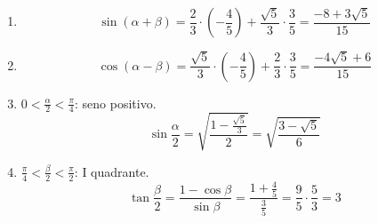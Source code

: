 \begin{question}[ID=1.1, subtitle={Formule di addizione con $\sin\alpha=2/3$ e $\sin\beta=3/5$}, tags={goniometria, formule di addizione}, difficulty=media]
\begin{explanation}
\begin{enumerate}
    \item \[ \sin(\alpha+\beta)=\dfrac23\cdot\left(-\dfrac45\right)+\dfrac{\sqrt5}{3}\cdot\dfrac35=\dfrac{-8+3\sqrt5}{15} \]
    \item \[ \cos(\alpha-\beta)=\dfrac{\sqrt5}{3}\cdot\left(-\dfrac45\right)+\dfrac23\cdot\dfrac35=\dfrac{-4\sqrt5+6}{15} \]
    \item $0<\tfrac\alpha2<\tfrac\pi4$: seno positivo.
    \[ \sin\dfrac\alpha2=\sqrt{\dfrac{1-\frac{\sqrt5}{3}}{2}}=\sqrt{\dfrac{3-\sqrt5}{6}} \]
    \item $\tfrac\pi4<\tfrac\beta2<\tfrac\pi2$: I quadrante.
    \[ \tan\dfrac\beta2=\dfrac{1-\cos\beta}{\sin\beta}=\dfrac{1+\frac45}{\frac35}=\dfrac{9}{5}\cdot\dfrac53=3 \]
\end{enumerate}
\end{explanation}
\end{question}


